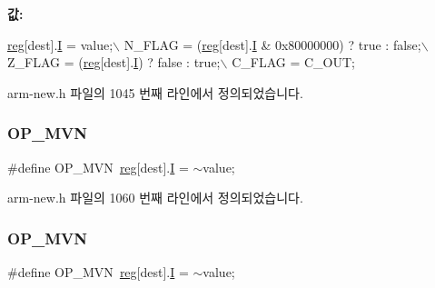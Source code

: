 {\bfseries 값\+:}
\begin{DoxyCode}
\mbox{\hyperlink{_g_b_a_8h_ae29faba89509024ffd1a292badcedf2d}{reg}}[dest].\mbox{\hyperlink{unionreg__pair_a9f6a42d56c07829d7013571eda998252}{I}} = value;\(\backslash\)
    N\_FLAG = (\mbox{\hyperlink{_g_b_a_8h_ae29faba89509024ffd1a292badcedf2d}{reg}}[dest].\mbox{\hyperlink{unionreg__pair_a9f6a42d56c07829d7013571eda998252}{I}} & 0x80000000) ? \textcolor{keyword}{true} : \textcolor{keyword}{false};\(\backslash\)
    Z\_FLAG = (\mbox{\hyperlink{_g_b_a_8h_ae29faba89509024ffd1a292badcedf2d}{reg}}[dest].\mbox{\hyperlink{unionreg__pair_a9f6a42d56c07829d7013571eda998252}{I}}) ? \textcolor{keyword}{false} : \textcolor{keyword}{true};\(\backslash\)
    C\_FLAG = C\_OUT;
\end{DoxyCode}


arm-\/new.\+h 파일의 1045 번째 라인에서 정의되었습니다.

\mbox{\label{arm-new_8h_abe78869a84343f6d31f91a5b991f0798}} 
\subsubsection{\texorpdfstring{O\+P\+\_\+\+M\+VN}{OP\_MVN}\hspace{0.1cm}{\footnotesize\ttfamily [1/2]}}
{\footnotesize\ttfamily \#define O\+P\+\_\+\+M\+VN~\mbox{\hyperlink{_globals_8h_ae29faba89509024ffd1a292badcedf2d}{reg}}\mbox{[}dest\mbox{]}.\mbox{\hyperlink{thumb_8h_a782b7c7c9a56a2031f6270eac7f000d6}{I}} = $\sim$value;}



arm-\/new.\+h 파일의 1060 번째 라인에서 정의되었습니다.

\mbox{\label{_g_b_a_8cpp_abe78869a84343f6d31f91a5b991f0798}} 
\subsubsection{\texorpdfstring{O\+P\+\_\+\+M\+VN}{OP\_MVN}\hspace{0.1cm}{\footnotesize\ttfamily [2/2]}}
{\footnotesize\ttfamily \#define O\+P\+\_\+\+M\+VN~\mbox{\hyperlink{_globals_8h_ae29faba89509024ffd1a292badcedf2d}{reg}}\mbox{[}dest\mbox{]}.\mbox{\hyperlink{thumb_8h_a782b7c7c9a56a2031f6270eac7f000d6}{I}} = $\sim$value;}


